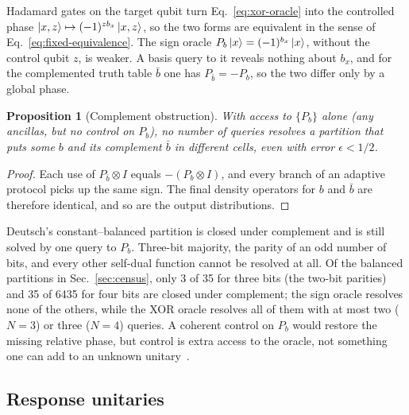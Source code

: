 \documentclass[
  aps,
  pra,
  reprint,
  nofootinbib
]{revtex4-2}
\newtheorem{proposition}{Proposition}
\begin{document}
Hadamard gates on the target qubit turn Eq.~\eqref{eq:xor-oracle} into the
controlled phase \(\ket{x,z}\mapsto(-1)^{z b_x}\ket{x,z}\), so the two forms
are equivalent in the sense of Eq.~\eqref{eq:fixed-equivalence}. The sign
oracle \(P_b\ket x=(-1)^{b_x}\ket x\), without the control qubit \(z\), is
weaker. A basis query to it reveals nothing about \(b_x\), and for the
complemented truth table \(\bar b\) one has \(P_{\bar b}=-P_b\), so the two
differ only by a global phase.

\begin{proposition}[Complement obstruction]\label{prop:sign}
With access to \(\{P_b\}\) alone (any ancillas, but no control on \(P_b\)), no
number of queries resolves a partition that puts some \(b\) and its complement
\(\bar b\) in different cells, even with error \(\epsilon<1/2\).
\end{proposition}

\begin{proof}
Each use of \(P_{\bar b}\otimes I\) equals \(-(P_b\otimes I)\), and every branch
of an adaptive protocol picks up the same sign. The final density operators for
\(b\) and \(\bar b\) are therefore identical, and so are the output
distributions.
\end{proof}

Deutsch's constant--balanced partition is closed under complement and is still
solved by one query to \(P_b\). Three-bit majority, the parity of an odd number
of bits, and every other self-dual function cannot be resolved at all. Of the
balanced partitions in Sec.~\ref{sec:census}, only 3 of 35 for three bits (the
two-bit parities) and 35 of 6435 for four bits are closed under complement;
the sign oracle resolves none of the others, while the XOR oracle resolves all
of them with at most two (\(N=3\)) or three (\(N=4\)) queries. A coherent
control on \(P_b\) would restore the missing relative phase, but control is
extra access to the oracle, not something one can add to an unknown
unitary~\cite{AraujoFeixCostaBrukner2014}.

\subsection{Response unitaries}
\end{document}

